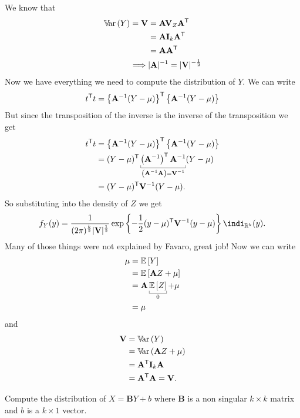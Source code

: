 \documentclass[12pt]{report}
\begin{document}
We know that
\begin{align*}
	\mathbb{V}\!\mathrm{ar}\,(Y)=\mathbf{V}&=\mathbf{A}\mathbf{V}_{Z}\mathbf{A}^{\mathsf{T}}\\
	&=\mathbf{A}\mathbf{I}_{k}\mathbf{A}^{\mathsf{T}}\\
	&=\mathbf{A}\mathbf{A}^{\mathsf{T}}\\
	\implies&|\mathbf{A}|^{-1}=|\mathbf{V}|^{-\frac{1}{2}}
\end{align*}
Now we have everything we need to compute the distribution of $Y$. We can write
\begin{equation*}
	t^{\mathsf{T}}t=\left\{\mathbf{A}^{-1}(Y-\mu)\right\}^{\mathsf{T}}\left\{\mathbf{A}^{-1}(Y-\mu)\right\}
\end{equation*}
But since the transposition of the inverse is the inverse of the transposition we get
\begin{align*}
	t^{\trsp}t&=\left\{\mathbf{A}^{-1}(Y-\mu)\right\}^{\trsp}\left\{\mathbf{A}^{-1}(Y-\mu)\right\}\\
	&=(Y-\mu)^{\trsp}\ubracketthin{\left(\mathbf{A}^{-1}\right)^{\trsp}\mathbf{A}^{-1}}_{\mathclap{\left(\mathbf{A}^{-1}\mathbf{A}\right)=\mathbf{V}^{-1}}}(Y-\mu)\\
	&=(Y-\mu)^{\trsp}\mathbf{V}^{-1}(Y-\mu).
\end{align*}
So substituting into the density of $Z$ we get
\begin{equation*}
	f_{Y}(y)=\frac{1}{(2\pi)^{\frac{k}{2}}|\mathbf{V}|^{\unmezz}}\expg{-\unmezz(y-\mu)^{\trsp}\mathbf{V}^{-1}(y-\mu)}\indi_{\R^{k}}(y).
\end{equation*}
Many of those things were not explained by Favaro, great job! Now we can write
\begin{align*}
	\mu&=\ev{Y}\\
	&=\ev{\mathbf{A}Z+\mu}\\
	&=\mathbf{A}\ubracketthin{\ev{Z}}_{0}+\mu\\
	&=\mu
\end{align*}
and
\begin{align*}
	\mathbf{V}&=\mathbb{V}\!\mathrm{ar}\,(Y)\\
	&=\mathbb{V}\!\mathrm{ar}\,(\mathbf{A}Z+\mu)\\
	&=\mathbf{A}^{\mathsf{T}}\mathbf{I}_{k}\mathbf{A}\\
	&=\mathbf{A}^{\mathsf{T}}\mathbf{A}=\mathbf{V}.
\end{align*}
\begin{exercise}
	Compute the distribution of $X=\mathbf{B}Y+b$ where $\mathbf{B}$ is a non singular $k\times k$ matrix and $b$ is a $k\times 1$ vector.
\end{exercise}
\end{document}
